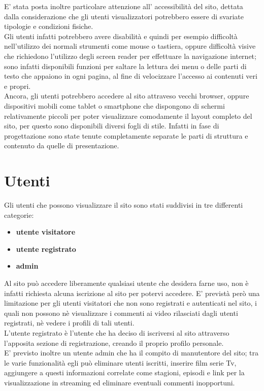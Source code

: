\n E' stata posta inoltre particolare attenzione all' accessibilità del sito, dettata dalla considerazione che gli utenti visualizzatori potrebbero essere di svariate tipologie e condizioni fisiche.\\
Gli utenti infatti potrebbero avere disabilità e quindi per esempio difficoltà nell'utilizzo dei normali strumenti come mouse o tastiera, oppure difficoltà visive che richiedono l'utilizzo degli screen reader per effettuare la navigazione internet; sono infatti disponibili funzioni per saltare la lettura dei menu o delle parti di testo che appaiono in ogni pagina, al fine di velocizzare l'accesso ai contenuti veri e propri.\\
Ancora, gli utenti potrebbero accedere al sito attraveso vecchi browser, oppure dispositivi mobili come tablet o smartphone che dispongono di schermi relativamente piccoli per poter visualizzare comodamente il layout completo del sito, per questo sono disponibili diversi fogli di stile. Infatti in fase di progettazione sono state tenute completamente separate le parti di struttura e contenuto da quelle di presentazione. \\


\section{Utenti}
Gli utenti che possono visualizzare il sito sono stati suddivisi in tre differenti categorie:
\begin{itemize}
\item \textbf{utente visitatore}
\item \textbf{utente registrato}
\item \textbf{admin}
\end{itemize}

\n Al sito può accedere liberamente qualsiasi utente che desidera farne uso, non è infatti richiesta alcuna iscrizione al sito per potervi accedere. E' previstà però una limitazione per gli utenti visitatori che non sono registrati e autenticati nel sito, i quali non possono nè visualizzare i commenti ai video rilasciati dagli utenti registrati, nè vedere i profili di tali utenti.\\
L'utente registrato è l'utente che ha deciso di iscriversi al sito attraverso l'apposita sezione di registrazione, creando il proprio profilo personale.\\
E' previsto inoltre un utente admin che ha il compito di manutentore del sito; tra le varie funzionalità egli può eliminare utenti iscritti, inserire film serie Tv, aggiungere a questi informazioni correlate come stagioni, episodi e link per la visualizzazione in streaming ed eliminare eventuali commenti inopportuni.



